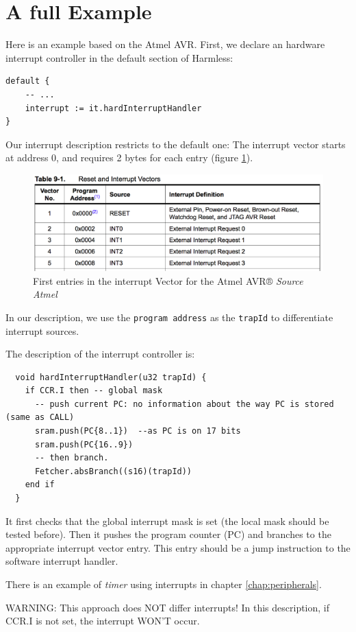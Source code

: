 \section{A full Example}
Here is an example based on the Atmel AVR. First, we declare an hardware interrupt controller in the default section of Harmless:
\begin{lstlisting}
default {
    -- ...
    interrupt := it.hardInterruptHandler
}
\end{lstlisting}

Our interrupt description restricts to the default one: The interrupt vector starts at address 0, and requires 2 bytes for each entry (figure \ref{fig:itAVR}).
\begin{figure}[h]	
  \begin{center}
    \includegraphics[width=0.95 \linewidth]{../common/images/exampleInterruptVectorAVR.png}
    \caption{First entries in the interrupt Vector for the Atmel AVR® \emph{Source Atmel}}
    \label{fig:itAVR}
  \end{center}
\end{figure}
In our description, we use the \texttt{program address} as the \texttt{trapId} to differentiate interrupt sources.

The description of the interrupt controller is:
\begin{lstlisting}
  void hardInterruptHandler(u32 trapId) {
    if CCR.I then -- global mask    
      -- push current PC: no information about the way PC is stored (same as CALL)
      sram.push(PC{8..1})  --as PC is on 17 bits
      sram.push(PC{16..9})
      -- then branch.
      Fetcher.absBranch((s16)(trapId))
    end if
  }
\end{lstlisting}
It first checks that the global interrupt mask is set (the local mask should be tested before). Then it pushes the program counter (PC) and branches to the appropriate interrupt vector entry. This entry should be a jump instruction to the software interrupt handler. 

There is an example of \emph{timer} using interrupts in chapter \ref{chap:peripherals}.


WARNING: This approach does NOT differ interrupts! In this description, if CCR.I is not set, the interrupt WON'T occur.